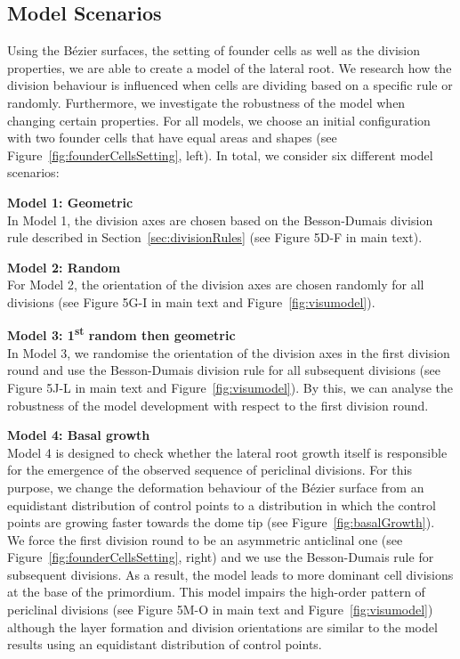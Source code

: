 \documentclass[11pt,a4paper, final]{article}
\begin{document}
\subsection{Model Scenarios}
\label{sec:modelScenarios}
\noindent
Using the B\'ezier surfaces, the setting of founder cells as well as the division properties, we are able to create a model of the lateral root. We research how the division behaviour is influenced when cells are dividing based on a specific rule or randomly. Furthermore, we investigate the robustness of the model when changing certain properties. For all models, we choose an initial configuration with two founder cells that have equal areas and shapes (see Figure~\ref{fig:founderCellsSetting}, left). In total, we consider six different model scenarios:

\noindent
\textbf{Model 1: Geometric}\\
\noindent
In Model 1, the division axes are chosen based on the Besson-Dumais division rule described in Section~\ref{sec:divisionRules} (see Figure 5D-F in main text).

\noindent
\textbf{Model 2: Random}\\
\noindent
For Model 2, the orientation of the division axes are chosen randomly for all divisions (see Figure 5G-I in main text and Figure~\ref{fig:visumodel}).

\noindent
\textbf{Model 3: 1\textsuperscript{st} random then geometric}\\
\noindent
In Model 3, we randomise the orientation of the division axes in the first division round and use the Besson-Dumais division rule for all subsequent divisions (see Figure 5J-L in main text and Figure~\ref{fig:visumodel}). By this, we can analyse the robustness of the model development with respect to the first division round.

\noindent
\textbf{Model 4: Basal growth}\\
\noindent
Model 4 is designed to check whether the lateral root growth itself is responsible for the emergence of the observed sequence of periclinal divisions. For this purpose, we change the deformation behaviour of the B\'ezier surface from an equidistant distribution of control points to a distribution in which the control points are growing faster towards the dome tip (see Figure~\ref{fig:basalGrowth}). We force the first division round to be an asymmetric anticlinal one (see Figure~\ref{fig:founderCellsSetting}, right) and we use the Besson-Dumais rule for subsequent divisions. As a result, the model leads to more dominant cell divisions at the base of the primordium. This model impairs the high-order pattern of periclinal divisions (see Figure 5M-O in main text and Figure~\ref{fig:visumodel}) although the layer formation and division orientations are similar to the model results using an equidistant distribution of control points.
\end{document}

